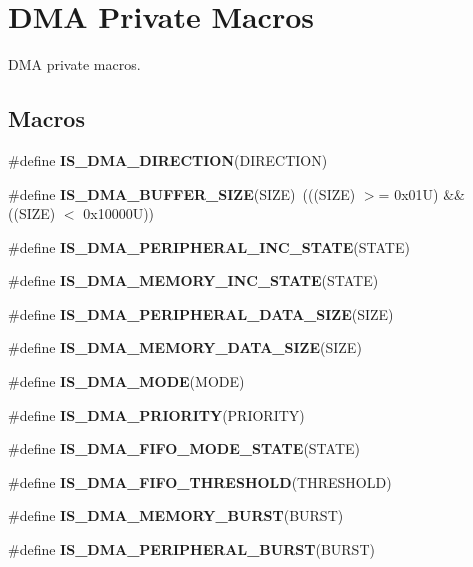 \hypertarget{group___d_m_a___private___macros}{}\section{D\+MA Private Macros}
\label{group___d_m_a___private___macros}


D\+MA private macros.  


\subsection*{Macros}
\begin{DoxyCompactItemize}
\item 
\#define {\bfseries I\+S\+\_\+\+D\+M\+A\+\_\+\+D\+I\+R\+E\+C\+T\+I\+ON}(D\+I\+R\+E\+C\+T\+I\+ON)
\item 
\mbox{\label{group___d_m_a___private___macros_ga72ef4033bb3bc2cdfdbe579083b05e32}} 
\#define {\bfseries I\+S\+\_\+\+D\+M\+A\+\_\+\+B\+U\+F\+F\+E\+R\+\_\+\+S\+I\+ZE}(S\+I\+ZE)~(((S\+I\+ZE) $>$= 0x01\+U) \&\& ((\+S\+I\+Z\+E) $<$ 0x10000\+U))
\item 
\#define {\bfseries I\+S\+\_\+\+D\+M\+A\+\_\+\+P\+E\+R\+I\+P\+H\+E\+R\+A\+L\+\_\+\+I\+N\+C\+\_\+\+S\+T\+A\+TE}(S\+T\+A\+TE)
\item 
\#define {\bfseries I\+S\+\_\+\+D\+M\+A\+\_\+\+M\+E\+M\+O\+R\+Y\+\_\+\+I\+N\+C\+\_\+\+S\+T\+A\+TE}(S\+T\+A\+TE)
\item 
\#define {\bfseries I\+S\+\_\+\+D\+M\+A\+\_\+\+P\+E\+R\+I\+P\+H\+E\+R\+A\+L\+\_\+\+D\+A\+T\+A\+\_\+\+S\+I\+ZE}(S\+I\+ZE)
\item 
\#define {\bfseries I\+S\+\_\+\+D\+M\+A\+\_\+\+M\+E\+M\+O\+R\+Y\+\_\+\+D\+A\+T\+A\+\_\+\+S\+I\+ZE}(S\+I\+ZE)
\item 
\#define {\bfseries I\+S\+\_\+\+D\+M\+A\+\_\+\+M\+O\+DE}(M\+O\+DE)
\item 
\#define {\bfseries I\+S\+\_\+\+D\+M\+A\+\_\+\+P\+R\+I\+O\+R\+I\+TY}(P\+R\+I\+O\+R\+I\+TY)
\item 
\#define {\bfseries I\+S\+\_\+\+D\+M\+A\+\_\+\+F\+I\+F\+O\+\_\+\+M\+O\+D\+E\+\_\+\+S\+T\+A\+TE}(S\+T\+A\+TE)
\item 
\#define {\bfseries I\+S\+\_\+\+D\+M\+A\+\_\+\+F\+I\+F\+O\+\_\+\+T\+H\+R\+E\+S\+H\+O\+LD}(T\+H\+R\+E\+S\+H\+O\+LD)
\item 
\#define {\bfseries I\+S\+\_\+\+D\+M\+A\+\_\+\+M\+E\+M\+O\+R\+Y\+\_\+\+B\+U\+R\+ST}(B\+U\+R\+ST)
\item 
\#define {\bfseries I\+S\+\_\+\+D\+M\+A\+\_\+\+P\+E\+R\+I\+P\+H\+E\+R\+A\+L\+\_\+\+B\+U\+R\+ST}(B\+U\+R\+ST)
\end{DoxyCompactItemize}


